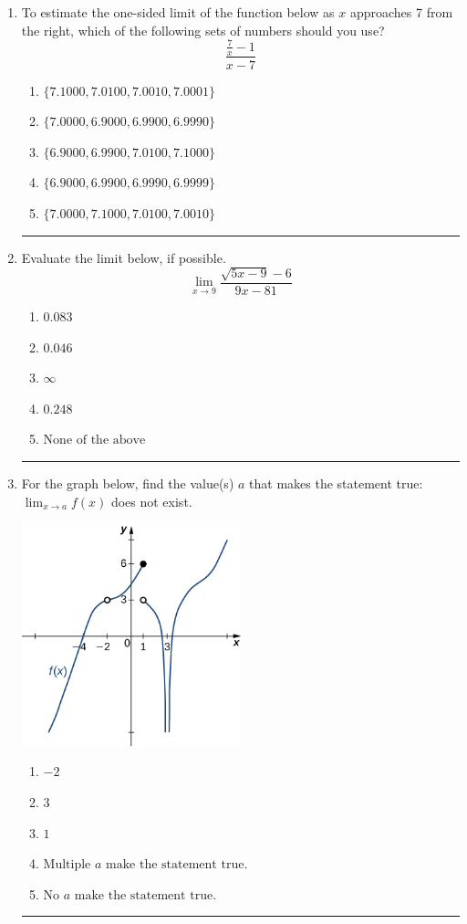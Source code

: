 \documentclass[14pt]{extbook}
\newcommand{\litem}[1]{\item#1\hspace*{-1cm}\rule{\textwidth}{0.4pt}}
\begin{document}
\begin{enumerate}
{\begin{enumerate}[label=\Alph*.]
\end{enumerate} }
\litem{
To estimate the one-sided limit of the function below as $x$ approaches 7 from the right, which of the following sets of numbers should you use?\[ \frac{\frac{7}{x} - 1}{x - 7} \]\begin{enumerate}[label=\Alph*.]
\item \( \{ 7.1000, 7.0100, 7.0010, 7.0001 \} \)
\item \( \{ 7.0000, 6.9000, 6.9900, 6.9990 \} \)
\item \( \{ 6.9000, 6.9900, 7.0100, 7.1000 \} \)
\item \( \{ 6.9000, 6.9900, 6.9990, 6.9999 \} \)
\item \( \{ 7.0000, 7.1000, 7.0100, 7.0010 \} \)

\end{enumerate} }
\litem{
Evaluate the limit below, if possible.\[ \lim_{x \rightarrow 9} \frac{\sqrt{5x - 9} - 6}{9x - 81} \]\begin{enumerate}[label=\Alph*.]
\item \( 0.083 \)
\item \( 0.046 \)
\item \( \infty \)
\item \( 0.248 \)
\item \( \text{None of the above} \)

\end{enumerate} }
\litem{
For the graph below, find the value(s) $a$ that makes the statement true: $ \displaystyle \lim_{x \rightarrow a} f(x)$ does not exist.
\begin{center}
    \includegraphics[width=0.5\textwidth]{../Figures/evaluateLimitGraphicallyB.png}
\end{center}
\begin{enumerate}[label=\Alph*.]
\item \( -2 \)
\item \( 3 \)
\item \( 1 \)
\item \( \text{Multiple } a \text{ make the statement true}. \)
\item \( \text{No } a \text{ make the statement true}. \)


\end{enumerate}}
\end{enumerate}
\end{document}
